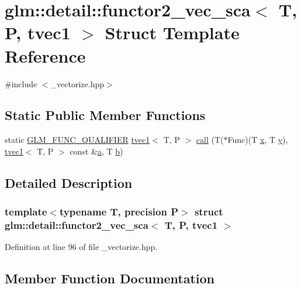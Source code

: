 \hypertarget{structglm_1_1detail_1_1functor2__vec__sca_3_01_t_00_01_p_00_01tvec1_01_4}{}\section{glm\+::detail\+::functor2\+\_\+vec\+\_\+sca$<$ T, P, tvec1 $>$ Struct Template Reference}
\label{structglm_1_1detail_1_1functor2__vec__sca_3_01_t_00_01_p_00_01tvec1_01_4}


{\ttfamily \#include $<$\+\_\+vectorize.\+hpp$>$}

\subsection*{Static Public Member Functions}
\begin{DoxyCompactItemize}
\item 
static \mbox{\hyperlink{setup_8hpp_a33fdea6f91c5f834105f7415e2a64407}{G\+L\+M\+\_\+\+F\+U\+N\+C\+\_\+\+Q\+U\+A\+L\+I\+F\+I\+ER}} \mbox{\hyperlink{structglm_1_1tvec1}{tvec1}}$<$ T, P $>$ \mbox{\hyperlink{structglm_1_1detail_1_1functor2__vec__sca_3_01_t_00_01_p_00_01tvec1_01_4_a2a66b135799442e1bdee02afc859064d}{call}} (T($\ast$Func)(T \mbox{\hyperlink{glad_8h_a92d0386e5c19fb81ea88c9f99644ab1d}{x}}, T \mbox{\hyperlink{glad_8h_a66ddd433d2cacfe27f5906b7e86faeed}{y}}), \mbox{\hyperlink{structglm_1_1tvec1}{tvec1}}$<$ T, P $>$ const \&\mbox{\hyperlink{glad_8h_ac8729153468b5dcf13f971b21d84d4e5}{a}}, T \mbox{\hyperlink{glad_8h_a6eba317e3cf44d6d26c04a5a8f197dcb}{b}})
\end{DoxyCompactItemize}


\subsection{Detailed Description}
\subsubsection*{template$<$typename T, precision P$>$\newline
struct glm\+::detail\+::functor2\+\_\+vec\+\_\+sca$<$ T, P, tvec1 $>$}



Definition at line 96 of file \+\_\+vectorize.\+hpp.



\subsection{Member Function Documentation}
\mbox{\label{structglm_1_1detail_1_1functor2__vec__sca_3_01_t_00_01_p_00_01tvec1_01_4_a2a66b135799442e1bdee02afc859064d}} 
